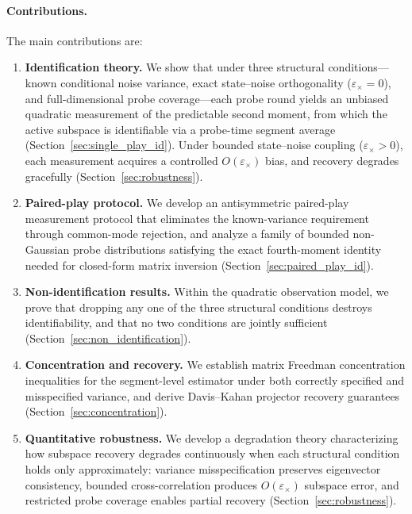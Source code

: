 \documentclass[12pt]{article}
\theoremstyle{plain}
\theoremstyle{definition}
\begin{document}
\paragraph{Contributions.}
The main contributions are:
\begin{enumerate}[leftmargin=1.5em]
\item \textbf{Identification theory.} We show that under three structural conditions---known conditional noise variance, exact state--noise orthogonality ($\varepsilon_\times = 0$), and full-dimensional probe coverage---each probe round yields an unbiased quadratic measurement of the predictable second moment, from which the active subspace is identifiable via a probe-time segment average (Section~\ref{sec:single_play_id}). Under bounded state--noise coupling ($\varepsilon_\times > 0$), each measurement acquires a controlled $O(\varepsilon_\times)$ bias, and recovery degrades gracefully (Section~\ref{sec:robustness}).

\item \textbf{Paired-play protocol.} We develop an antisymmetric paired-play measurement protocol that eliminates the known-variance requirement through common-mode rejection, and analyze a family of bounded non-Gaussian probe distributions satisfying the exact fourth-moment identity needed for closed-form matrix inversion (Section~\ref{sec:paired_play_id}).

\item \textbf{Non-identification results.} Within the quadratic observation model, we prove that dropping any one of the three structural conditions destroys identifiability, and that no two conditions are jointly sufficient (Section~\ref{sec:non_identification}).

\item \textbf{Concentration and recovery.} We establish matrix Freedman concentration inequalities for the segment-level estimator under both correctly specified and misspecified variance, and derive Davis--Kahan projector recovery guarantees (Section~\ref{sec:concentration}).

\item \textbf{Quantitative robustness.} We develop a degradation theory characterizing how subspace recovery degrades continuously when each structural condition holds only approximately: variance misspecification preserves eigenvector consistency, bounded cross-correlation produces $O(\varepsilon_\times)$ subspace error, and restricted probe coverage enables partial recovery (Section~\ref{sec:robustness}).


\end{enumerate}
\end{document}
